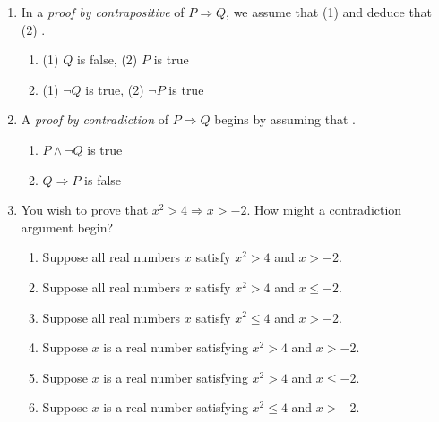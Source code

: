 \pagestyle{empty}


\begin{enumerate}
	\item In a \emph{proof by contrapositive} of $P\Longrightarrow Q$, we assume that (1) \underline{\phantom{$Q$ is false}\qquad\qquad} and deduce that (2) \underline{\phantom{$P$ is false}\qquad\qquad}.
  \begin{enumerate}
      \item {}
      (1) $Q$ is false, \quad (2) $P$ is true
      \setcounter{enumii}{2}
      \item {}
      (1) $\neg Q$ is true, \quad (2) $\neg P$ is true
  \end{enumerate}
  
  
  \item A \emph{proof by contradiction} of $P\Longrightarrow Q$ begins by assuming that \underline{\phantom{$P$ is true and $Q$ is false}\qquad\qquad}.
  \begin{enumerate}
      \item {} $P \wedge \neg Q$ is true
      \setcounter{enumii}{2}
      \item {} $Q\Longrightarrow P$ is false
  \end{enumerate}
  
  
  \item You wish to prove that $x^2>4\Longrightarrow x>-2$. How might a contradiction argument begin?
  \begin{enumerate}
    \item Suppose all real numbers $x$ satisfy $x^2>4$ and $x>-2$.
    \item Suppose all real numbers $x$ satisfy $x^2>4$ and $x\le -2$.
    \item Suppose all real numbers $x$ satisfy $x^2\le 4$ and $x>-2$.
    \item Suppose $x$ is a real number satisfying $x^2>4$ and $x>-2$.
    \item Suppose $x$ is a real number satisfying $x^2>4$ and $x\le -2$.
    \item Suppose $x$ is a real number satisfying $x^2\le 4$ and $x>-2$.
  \end{enumerate}


\end{enumerate}
